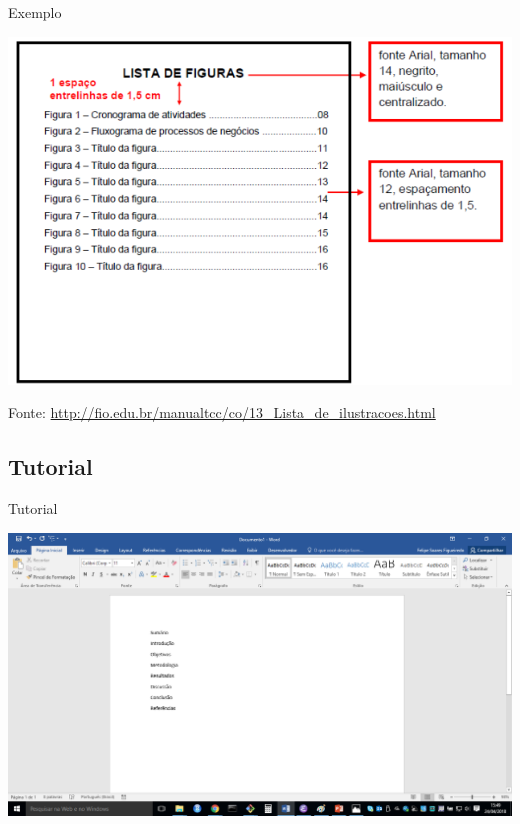 \documentclass{beamer}
\begin{document}
\begin{frame}{\scriptsize }
  \begin{exampleblock}{Exemplo}
    \begin{center}
      \includegraphics[height=0.8\textheight]{EstruturaII/lista_figuras}
    \end{center}
  \end{exampleblock}

  \vfill
  \scriptsize
  \hfill Fonte: {\tiny \url{http://fio.edu.br/manualtcc/co/13_Lista_de_ilustracoes.html}}
\end{frame}

\subsection{Tutorial}

\begin{frame}{\scriptsize Tutorial}
  \begin{center}
    \includegraphics[width=\textwidth]{EstruturaII/sumario1}
  \end{center}
\end{frame}
\end{document}
